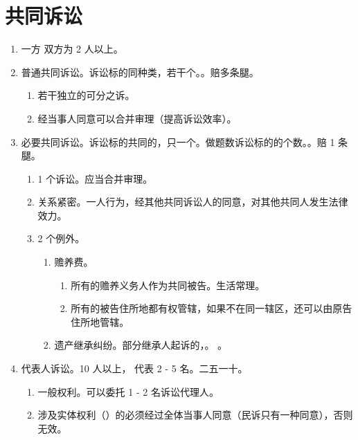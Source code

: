 \section{共同诉讼}
\begin{enumerate}
  \item 一方 \hz 双方为 2 人以上。
  \item 普通共同诉讼。诉讼标的同种类，若干个。。赔多条腿。
        \begin{enumerate}
          \item 若干独立的可分之诉。
          \item 经当事人同意可以合并审理（提高诉讼效率）。
        \end{enumerate}
  \item 必要共同诉讼。诉讼标的共同的，只一个。做题数诉讼标的的个数。。赔 1 条腿。
        \begin{enumerate}
          \item 1 个诉讼。应当合并审理。
          \item 关系紧密。一人行为，经其他共同诉讼人的同意，对其他共同人发生法律效力。
          \item 2 个例外。
                \begin{enumerate}
                  \item 赡养费。
                        \begin{enumerate}
                          \item 所有的赡养义务人作为共同被告。生活常理。
                          \item 所有的被告住所地都有权管辖，如果不在同一辖区，还可以由原告住所地管辖。
                        \end{enumerate}
                  \item 遗产继承纠纷。部分继承人起诉的，。
                        。
                \end{enumerate}
        \end{enumerate}
  \item 代表人诉讼。10 人以上， 代表 2 - 5 名。二五一十。
        \begin{enumerate}
          \item 一般权利。可以委托 1 - 2 名诉讼代理人。
          \item 涉及实体权利（）的必须经过全体当事人同意（民诉只有一种同意），否则无效。

\end{enumerate}
\end{enumerate}
